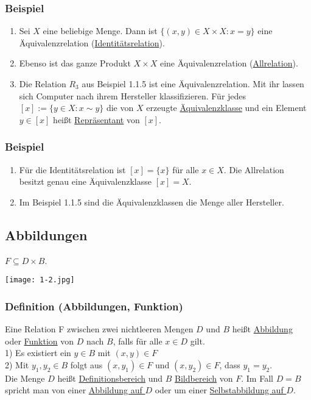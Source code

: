 \subsubsection{Beispiel}
\begin{enumerate}
\item Sei $X$ eine beliebige Menge.  Dann ist $\{(x,y)\in X\times X:x=y\}$ eine \"{A}quivalenzrelation (\underline{Identit\"{a}tsrelation}).
\item Ebenso ist das ganze Produkt $X\times X$ eine \"{A}quivalenzrelation (\underline{Allrelation}).
\item Die Relation $R_3$ aus Beispiel 1.1.5 ist eine \"{A}quivalenzrelation.  Mit ihr lassen sich Computer nach ihrem Hersteller klassifizieren.
F\"{u}r jedes $[x]:=\{y\in X:x \mathtt{\sim} y\}$ die von $X$ erzeugte \underline{\"{A}quivalenzklasse} und ein Element $y\in [x]$ heißt \underline{Repr\"{a}sentant} von $[x]$.
\end{enumerate}
\subsubsection{Beispiel}
\begin{enumerate}
\item F\"{u}r die Identit\"{a}tsrelation ist $[x]=\{x\}$ für alle $x\in X$.  Die Allrelation besitzt genau eine \"{A}quivalenzklasse $[x]=X$.
\item Im Beispiel 1.1.5 sind die \"{A}quivalenzklassen die Menge aller Hersteller.
\end{enumerate}

\subsection{Abbildungen}
$F\subseteq D\times B$.\\
\begin{center}
\texttt{[image: 1-2.jpg]}
\end{center}
\subsubsection{Definition (Abbildungen, Funktion)}
Eine Relation F zwischen zwei nichtleeren Mengen $D$ und $B$ heißt \underline{Abbildung} oder \underline{Funktion} von $D$ nach $B$, falls f\"{u}r alle $x\in D$ gilt.\\
1) Es existiert ein $y\in B$ mit $(x,y) \in F$\\
2) Mit $y_1,y_2\in B$ folgt aus $(x,y_1) \in F$ und $(x,y_2)\in F$, dass $y_1=y_2$.\\
Die Menge $D$ heißt \underline{Definitionsbereich}  und $B$ \underline{Bildbereich} von $F$.  Im Fall $D=B$ spricht man von einer \underline{Abbildung auf $D$} oder um einer \underline{Selbstabbildung auf $D$}.
